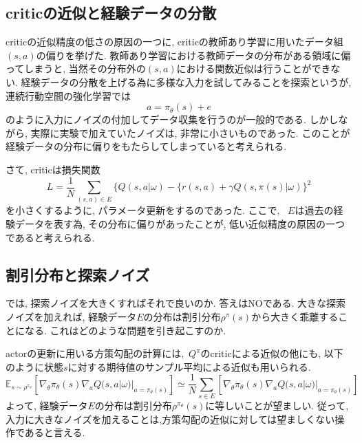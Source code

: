 \documentclass{jsarticle}
\newcommand{\expect}{\mathbb{E}}
\begin{document}
\subsection{criticの近似と経験データの分散}
criticの近似精度の低さの原因の一つに, criticの教師あり学習に用いたデータ組$(s,a)$の偏りを挙げた. 教師あり学習における教師データの分布がある領域に偏ってしまうと, 当然その分布外の$(s,a)$における関数近似は行うことができない. 経験データの分散を上げる為に多様な入力を試してみることを探索というが, 連続行動空間の強化学習では
\begin{equation}
	a = \pi_{\theta}(s) + e
\end{equation}
のように入力にノイズの付加してデータ収集を行うのが一般的である. しかしながら, 実際に実験で加えていたノイズは, 非常に小さいものであった. このことが経験データの分布に偏りをもたらしてしまっていると考えられる.\par
さて, criticは損失関数
\[L=\frac{1}{N}\sum_{(s,a)\in E}\{Q(s,a|\omega) - \{r(s,a)+\gamma Q(s,\pi(s)|\omega)\}^2\]
を小さくするように, パラメータ更新をするのであった. ここで, ~$E$は過去の経験データを表す為, その分布に偏りがあったことが, 低い近似精度の原因の一つであると考えられる. 


\subsection{割引分布と探索ノイズ}
では, 探索ノイズを大きくすればそれで良いのか. 答えはNOである. 大きな探索ノイズを加えれば, 経験データ$E$の分布は割引分布$\rho^{\pi}(s)$から大きく乖離することになる. これはどのような問題を引き起こすのか.\par
actorの更新に用いる方策勾配の計算には,~$Q^{\pi}$のcriticによる近似の他にも, 以下のように状態$s$に対する期待値のサンプル平均による近似も用いられる.
\[
\expect_{s\sim\rho^{\pi_{\theta}}}[\nabla_{\theta}\pi_{\theta}(s)\nabla_{a}Q(s, a|\omega)|_{a=\pi_{\theta}(s)}] \simeq \frac{1}{N}\sum_{s\in E}[\nabla_{\theta}\pi_{\theta}(s)\nabla_{a}Q(s, a|\omega)|_{a=\pi_{\theta}(s)}]
\]
よって, 経験データ$E$の分布は割引分布$\rho^{\pi_{\theta}}(s)$に等しいことが望ましい. 従って, 入力に大きなノイズを加えることは,方策勾配の近似に対しては望ましくない操作であると言える.
\end{document}
